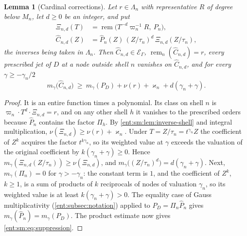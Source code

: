 \documentclass[11pt]{article}
\theoremstyle{plain}
\newtheorem{lemma}[lemma]{Lemma}
\theoremstyle{plain}
\theoremstyle{plain}
\theoremstyle{definition}
\theoremstyle{definition}
\theoremstyle{definition}
\theoremstyle{definition}
\theoremstyle{remark}
\newcommand{\E}{\mathcal E_\Gamma}
\DeclareMathOperator{\remp}{rem}\DeclareMathOperator{\Res}{Res}
\begin{document}
\begin{lemma}[Cardinal corrections]\label{ent:sm:lem:cardinal}
Let $r\in\Lambda_n$ with representative $R$ of degree below $M_n$, let
$d\ge0$ be an integer, and put
\begin{align}
 \Xi_{n,d}(T)&=\remp\bigl(T^{-d}\varpi_n^{-1}R,\ P_n\bigr),
 \label{ent:sm:eq:Xi}\\
 \widehat C_{n,d}(Z)&=\widehat P_n(Z)\,(Z/\tau_n)^d\,
   \Xi_{n,d}(Z/\tau_n),\label{ent:sm:eq:cardinal}
\end{align}
the inverses being taken in $\Lambda_n$. Then $\widehat C_{n,d}\in\E$,
$\remp_n(\widehat C_{n,d})=r$, every prescribed jet of $D$ at a node outside
shell $n$ vanishes on $\widehat C_{n,d}$, and for every $\gamma\ge-\gamma_n/2$
\begin{equation}\label{ent:sm:eq:suppression}
 m_\gamma\bigl(\widehat C_{n,d}\bigr)\ \ge\
 m_\gamma(P_D)+\nu(r)+\varkappa_n+d(\gamma_n+\gamma).
\end{equation}
\end{lemma}
\begin{proof}
It is an entire function times a polynomial. Its class on shell $n$ is
$\varpi_n\cdot T^d\cdot\Xi_{n,d}=r$, and on any other shell $h$ it vanishes
to the prescribed orders because $\widehat P_n$ contains the factor $\Pi_h$.
By \cref{ent:sm:lem:inverse-shell} and integral multiplication,
$\nu(\Xi_{n,d})\ge\nu(r)+\varkappa_n$. Under $T=Z/\tau_n=t^{\gamma_n}Z$ the
coefficient of $Z^k$ acquires the factor $t^{k\gamma_n}$, so its weighted
value at $\gamma$ exceeds the valuation of the original coefficient by
$k(\gamma_n+\gamma)\ge0$. Hence
$m_\gamma(\Xi_{n,d}(Z/\tau_n))\ge\nu(\Xi_{n,d})$, and
$m_\gamma\bigl((Z/\tau_n)^d\bigr)=d(\gamma_n+\gamma)$. Next,
$m_\gamma(\Pi_n)=0$ for $\gamma>-\gamma_n$: the constant term is $1$, and the
coefficient of $Z^k$, $k\ge1$, is a sum of products of $k$ reciprocals of
nodes of valuation $\gamma_n$, so its weighted value is at least
$k(\gamma_n+\gamma)>0$. The equality case of Gauss multiplicativity
(\cref{ent:subsec:notation}) applied to $P_D=\Pi_n\widehat P_n$ gives
$m_\gamma(\widehat P_n)=m_\gamma(P_D)$. The product estimate now gives
\eqref{ent:sm:eq:suppression}.
\end{proof}
\end{document}
